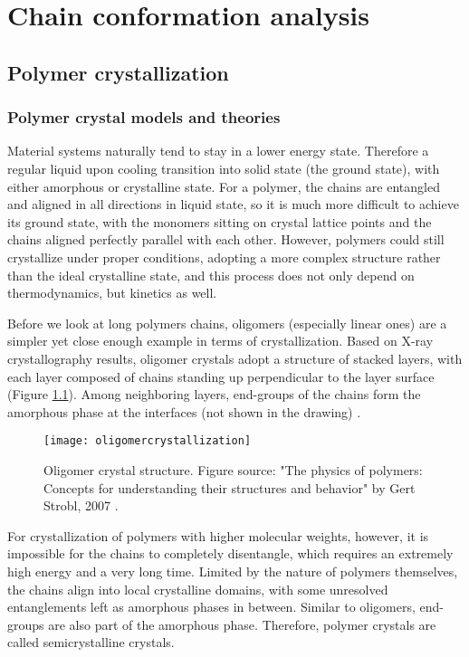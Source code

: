 \chapter{Chain conformation analysis}\label{chap_analysis}
\graphicspath{{./analysis/graphs/}}

\section{Polymer crystallization}

\subsection{Polymer crystal models and theories}

Material systems naturally tend to stay in a lower energy state. Therefore a regular liquid upon cooling transition into solid state (the ground state), with either amorphous or crystalline state. For a polymer, the chains are entangled and aligned in all directions in liquid state, so it is much more difficult to achieve its ground state, with the monomers sitting on crystal lattice points and the chains aligned perfectly parallel with each other. However, polymers could still crystallize under proper conditions, adopting a more complex structure rather than the ideal crystalline state, and this process does not only depend on thermodynamics, but kinetics as well.

Before we look at long polymers chains, oligomers (especially linear ones) are a simpler yet close enough example in terms of crystallization. Based on X-ray crystallography results, oligomer crystals adopt a structure of stacked layers, with each layer composed of chains standing up perpendicular to the layer surface (Figure \ref{fig:oligomercrystallization}). Among neighboring layers, end-groups of the chains form the amorphous phase at the interfaces (not shown in the drawing) \cite{Strobl2007}.

\begin{figure}[H]
\center
\vspace{1 cm}
\texttt{[image: oligomercrystallization]}
\caption[Oligomer crystal structure.]{Oligomer crystal structure. Figure source: "The physics of polymers: Concepts for understanding their structures and behavior" by Gert Strobl, 2007 \cite{Strobl2007}.}
\label{fig:oligomercrystallization}
\end{figure}

For crystallization of polymers with higher molecular weights, however, it is impossible for the chains to completely disentangle, which requires an extremely high energy and a very long time. Limited by the nature of polymers themselves, the chains align into local crystalline domains, with some unresolved entanglements left as amorphous phases in between. Similar to oligomers, end-groups are also part of the amorphous phase. Therefore, polymer crystals are called semicrystalline crystals.


